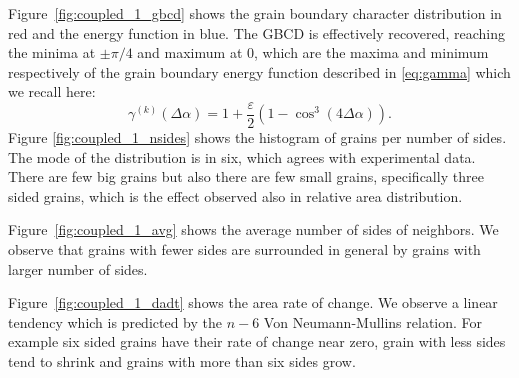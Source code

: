 Figure~\ref{fig:coupled_1_gbcd} shows the grain boundary character distribution in red and the energy function in blue. The GBCD is effectively recovered, reaching the minima at $\pm \pi/4$ and maximum at $0$, which are the maxima and minimum respectively of the grain boundary energy function described in \eqref{eq:gamma} which we recall here:
\begin{equation*}
    \gamma^{(k)}(\Delta \alpha) = 1 + \frac{\varepsilon}{2}\left(1-\cos^3(4\Delta\alpha)\right).
\end{equation*}
Figure \ref{fig:coupled_1_nsides} shows the histogram of grains per number of sides. 
The mode of the distribution is in six, which agrees with experimental data. 
There are few big grains but also there are few small grains, specifically three sided grains, which is the effect observed also in relative area distribution.

Figure~\ref{fig:coupled_1_avg} shows the average number of sides of neighbors. 
We observe that grains with fewer sides are surrounded in general by grains with larger number of sides.

Figure~\ref{fig:coupled_1_dadt} shows the area rate of change. 
We observe a linear tendency which is predicted by the $n-6$ Von Neumann-Mullins relation. 
For example six sided grains have their rate of change near zero, grain with less sides tend to shrink and grains with more than six sides grow.


